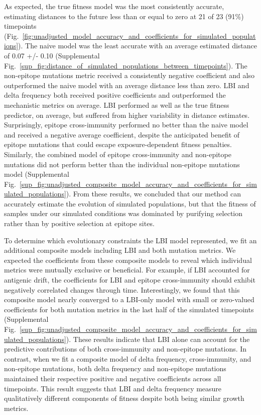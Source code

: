 As expected, the true fitness model was the most consistently accurate, estimating distances to the future less than or equal to zero at 21 of 23 (91\%) timepoints (Fig.~\ref{fig:unadjusted_model_accuracy_and_coefficients_for_simulated_populations}).
The naive model was the least accurate with an average estimated distance of 0.07 +/- 0.10 (Supplemental Fig.~\ref{sup_fig:distance_of_simulated_populations_between_timepoints}).
The non-epitope mutations metric received a consistently negative coefficient and also outperformed the naive model with an average distance less than zero.
LBI and delta frequency both received positive coefficients and outperformed the mechanistic metrics on average.
LBI performed as well as the true fitness predictor, on average, but suffered from higher variability in distance estimates.
Surprisingly, epitope cross-immunity performed no better than the naive model and received a negative average coefficient, despite the anticipated benefit of epitope mutations that could escape exposure-dependent fitness penalties.
Similarly, the combined model of epitope cross-immunity and non-epitope mutations did not perform better than the individual non-epitope mutations model (Supplemental Fig.~\ref{sup_fig:unadjusted_composite_model_accuracy_and_coefficients_for_simulated_populations}).
From these results, we concluded that our method can accurately estimate the evolution of simulated populations, but that the fitness of samples under our simulated conditions was dominated by purifying selection rather than by positive selection at epitope sites.

To determine which evolutionary constraints the LBI model represented, we fit an additional composite models including LBI and both mutation metrics.
We expected the coefficients from these composite models to reveal which individual metrics were mutually exclusive or beneficial.
For example, if LBI accounted for antigenic drift, the coefficients for LBI and epitope cross-immunity should exhibit negatively correlated changes through time.
Interestingly, we found that this composite model nearly converged to a LBI-only model with small or zero-valued coefficients for both mutation metrics in the last half of the simulated timepoints (Supplemental Fig.~\ref{sup_fig:unadjusted_composite_model_accuracy_and_coefficients_for_simulated_populations}).
These results indicate that LBI alone can account for the predictive contributions of both cross-immunity and non-epitope mutations.
In contrast, when we fit a composite model of delta frequency, cross-immunity, and non-epitope mutations, both delta frequency and non-epitope mutations maintained their respective positive and negative coefficients across all timepoints.
This result suggests that LBI and delta frequency measure qualitatively different components of fitness despite both being similar growth metrics.

